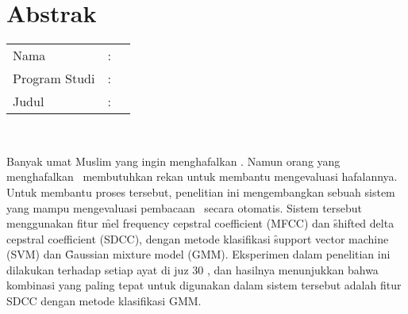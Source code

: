 %
%
%

\chapter*{Abstrak}

\vspace*{0.2cm}

\noindent \begin{tabular}{l l p{10cm}}
	Nama&: & \penulis \\
	Program Studi&: & \program \\
	Judul&: & \judul \\
\end{tabular} \\ 

\vspace*{0.5cm}

\noindent
Banyak umat Muslim yang ingin menghafalkan \quran. Namun orang yang menghafalkan \quran~membutuhkan rekan untuk membantu mengevaluasi hafalannya. Untuk membantu proses tersebut, penelitian ini mengembangkan sebuah sistem yang mampu mengevaluasi pembacaan \quran~secara otomatis. Sistem tersebut menggunakan fitur \f{mel frequency cepstral coefficient} (MFCC) dan \f{shifted delta cepstral coefficient} (SDCC), dengan metode klasifikasi \f{support vector machine} (SVM) dan \f{Gaussian mixture model} (GMM). Eksperimen dalam penelitian ini dilakukan terhadap setiap ayat di juz 30 \quran, dan hasilnya menunjukkan bahwa kombinasi yang paling tepat untuk digunakan dalam sistem tersebut adalah fitur SDCC dengan metode klasifikasi GMM. \\


